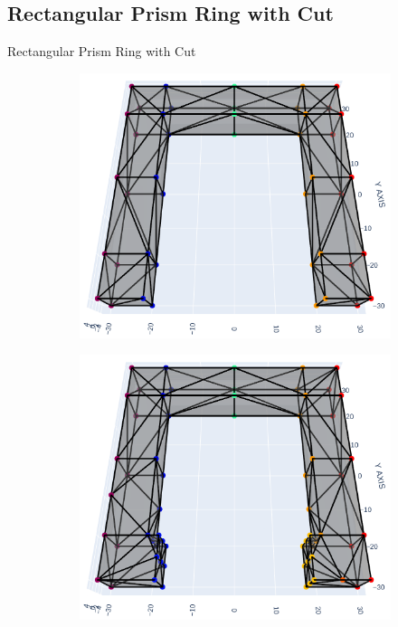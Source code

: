 \documentclass[xcolor=dvipsnames, aspectratio=169]{beamer}
\begin{document}
\subsection{Rectangular Prism Ring with Cut}
\begin{frame}{Rectangular Prism Ring with Cut}
\begin{figure}
\centering
\begin{subfigure}[b]{0.15\textwidth}
\includegraphics[width=\linewidth]{Final Run, (rect prism ring 40 mm cut) meshpy plotly screenshot.png}
\end{subfigure}
\begin{subfigure}[b]{0.15\textwidth}
\includegraphics[width=\linewidth]{Final Run, (rect prism ring 35 mm cut) meshpy plotly screenshot.png} 

\end{subfigure}
\end{figure}
\end{frame}
\end{document}
